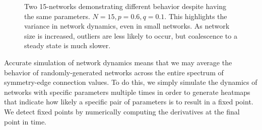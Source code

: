 \begin{figure}[h]
\begin{subfigure}{0.45\textwidth}
         \label{fig:1b}
     \end{subfigure}
     \caption{Two 15-networks demonstrating different behavior despite having the same parameters. $N=15, p=0.6, q=0.1$. This highlights the variance in network dynamics, even in small networks. As network size is increased, outliers are less likely to occur, but coalescence to a steady state is much slower.}
     \label{fig:1}
\end{figure}

Accurate simulation of network dynamics means that we may average the behavior of randomly-generated networks across the entire spectrum of symmetry-edge connection values. To do this, we simply simulate the dynamics of networks with specific parameters multiple times in order to generate heatmaps that indicate how likely a specific pair of parameters is to result in a fixed point. We detect fixed points by numerically computing the derivatives at the final point in time.

